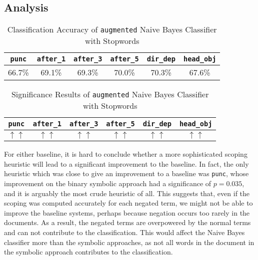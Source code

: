 \subsection{Analysis}
\begin{table*}[t]
\centering
\caption{Classification Accuracy of \texttt{augmented} Naive Bayes Classifier with Stopwords}
\label{tab:stop-c}
\begin{tabular}{|c|c|c|c|c|c|}
\hline
 \texttt{punc}& \texttt{after\_1}& \texttt{after\_3}&  \texttt{after\_5} & \texttt{dir\_dep}& \texttt{head\_obj}   \\ \hline
 66.7\%& 69.1\% & 69.3\% & 70.0\%  & 70.3\% & 67.6\%\\ \hline

\end{tabular}
\end{table*}
\begin{table*}[t]
\centering
\caption{Significance Results of \texttt{augmented} Naive Bayes Classifier with Stopwords}
\label{tab:stop-s}
\begin{tabular}{|c|c|c|c|c|c|}
\hline
 \texttt{punc}& \texttt{after\_1}& \texttt{after\_3}&  \texttt{after\_5} & \texttt{dir\_dep}& \texttt{head\_obj}   \\ \hline
  \textbf{$\uparrow\uparrow$}& \textbf{$\uparrow\uparrow$} & \textbf{$\uparrow\uparrow$}  & \textbf{$\uparrow\uparrow$}  & \textbf{$\uparrow\uparrow$} & \textbf{$\uparrow\uparrow$}\\ \hline
\end{tabular}
\end{table*}
For either baseline, it is hard to conclude whether a more sophisticated scoping heuristic will lead to a significant improvement to the baseline. In fact, the only heuristic which was close to give an improvement to a baseline was \texttt{punc}, whose improvement on the binary symbolic approach had a significance of $p = 0.035$, and it is arguably the most crude heuristic of all. This suggests that, even if the scoping was computed accurately for each negated term, we might not be able to improve the baseline systems, perhaps because negation occurs too rarely in the documents. As a result, the negated terms are overpowered by the normal terms and can not contribute to the classification. This would affect the Naive Bayes classifier more than the symbolic approaches, as not all words in the document in the symbolic approach contributes to the classification. 

